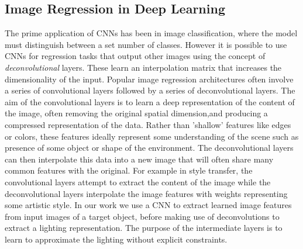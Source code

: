 \documentclass[ %
                    author={Gavin Parker},
                supervisor={Dr. Neill Campbell},
                    degree={MEng},
                     title={Deep Siamese Networks for Illumination Estimation from Stereo Images},
                  subtitle={},
                      type={Research},
                      year={2018} ]{dissertation}
\begin{document}
\subsection{Image Regression in Deep Learning}
The prime application of CNNs has been in image classification, where the model must distinguish between a set number of classes. However it is possible to use CNNs for regression tasks that output other images using the concept of \textit{deconvolutional} layers. These learn an interpolation matrix that increases the dimensionality of the input. Popular image regression architectures often involve a series of convolutional layers followed by a series of deconvolutional layers. The aim of the convolutional layers is to learn a deep representation of the content of the image, often removing the original spatial dimension,and producing a compressed representation of the data. Rather than 'shallow' features like edges or colors, these features ideally represent some understanding of the scene such as presence of some object or shape of the environment. The deconvolutional layers can then interpolate this data into a new image that will often share many common features with the original. For example in style transfer, the convolutional layers attempt to extract the content of the image while the deconvolutional layers interpolate the image features with weights representing some artistic style. In our work we use a CNN to extract learned image features from input images of a target object, before making use of deconvolutions to extract a lighting representation. The purpose of the intermediate layers is to learn to approximate the lighting without explicit constraints.
\end{document}
